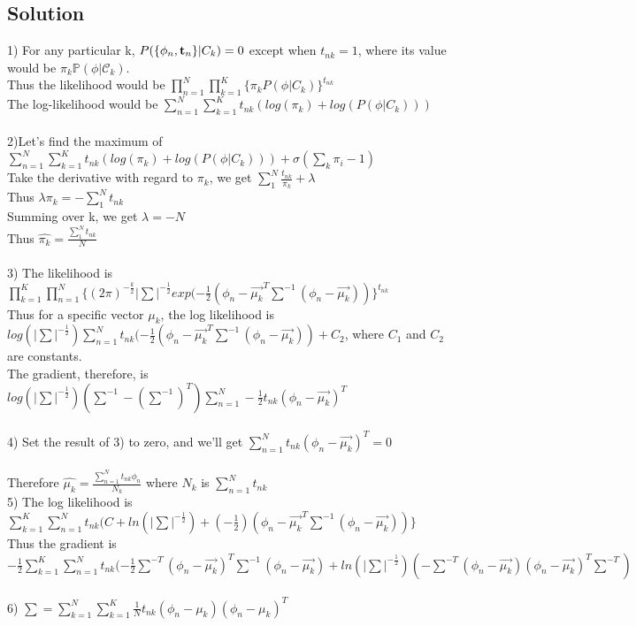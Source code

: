 \documentclass[submit]{harvardml}
\begin{document}
\subsection*{Solution}
1) For any particular k, $P(\{\phi_n, {\bf t}_n \} | C_k )=0$ except when $t_{nk}=1$, where its value would be $\pi_k \mathbb{P}(\phi|\mathcal{C}_k)$. \\
Thus the likelihood would be $\prod^N_{n=1} \prod^K_{k=1} \{\pi_k P(\phi|C_k)\}^{t_{nk}}$\\
The log-likelihood would be $\sum^N_{n=1}\sum^K_{k=1} t_{nk}(log(\pi_k)+log(P(\phi|C_k)))$\\
\\
2)Let's find the maximum of $\sum^N_{n=1} \sum^K_{k=1} t_{nk}(log(\pi_k)+log(P(\phi|C_k)))+\sigma(\sum_k \pi_i-1)$\\
Take the derivative with regard to $\pi_k$, we get $\sum^N_1 \frac{t_{nk}}{\pi_k}+\lambda$\\
Thus $\lambda \pi_k=-\sum^N_1 t_{nk}$\\
Summing over k, we get $\lambda=-N$\\
Thus $\hat{\pi_k}=\frac{\sum^N_1 t_{nk}}{N}$\\
\\
3) The likelihood is $\prod^K_{k=1} \prod^N_{n=1} \{(2\pi)^{-\frac{k}{2}}|\sum|^{-\frac{1}{2}}exp(-\frac{1}{2}(\phi_n - \vec{\mu_k}^{T}\sum^{-1}(\phi_n-\vec{\mu_k}))\}^{t_{nk}}$\\
Thus for a specific vector $\mu_k$, the log likelihood is $log(|\sum |^{-\frac{1}{2}}) \sum^N_{n=1}t_{nk} (-\frac{1}{2}(\phi_n - \vec{\mu_k}^{T}\sum^{-1}(\phi_n-\vec{\mu_k}))+C_2$, where $C_1$ and $C_2$ are constants.\\
The gradient, therefore, is $log(|\sum |^{-\frac{1}{2}})(\sum^{-1}-(\sum^{-1})^T)\sum^N_{n=1}-\frac{1}{2}t_{nk}(\phi_n-\vec{\mu_k})^T$\\
\\
4) Set the result of 3) to zero, and we'll get $\sum^N_{n=1}t_{nk}(\phi_n-\vec{\mu_k})^T=0$\\
\\Therefore $\hat{\mu_k}=\frac{\sum^N_{n=1}t_{nk}\phi_n}{N_k}$ where $N_k$ is $\sum^N_{n=1}t_{nk}$\\
5) The log likelihood is $\sum^K_{k=1} \sum^N_{n=1} t_{nk} (C+ln(|\sum|^{-\frac{1}{2}})+(-\frac{1}{2})(\phi_n - \vec{\mu_k}^{T}\sum^{-1}(\phi_n-\vec{\mu_k}))\}$\\
Thus the gradient is $-\frac{1}{2}\sum^K_{k=1} \sum^N_{n=1} t_{nk}(-\frac{1}{2}\sum^{-T}(\phi_n-\vec{\mu_k})^T\sum^{-1}(\phi_n-\vec{\mu_k})+ln(|\sum |^{-\frac{1}{2}})(-\sum^{-T}(\phi_n-\vec{\mu_k})(\phi_n-\vec{\mu_k})^T\sum^{-T})$\\
\\
6) $\sum=\sum^N_{k=1}\sum^K_{k=1}\frac{1}{N}t_{nk}(\phi_n-\mu_k)(\phi_n-\mu_k)^T$
\end{document}
